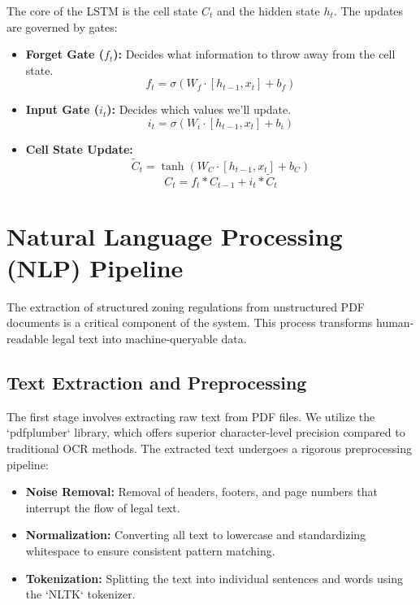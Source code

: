 \documentclass[12pt,a4paper]{report}
\begin{document}
The core of the LSTM is the cell state $C_t$ and the hidden state $h_t$. The updates are governed by gates:
\begin{itemize}
    \item \textbf{Forget Gate ($f_t$):} Decides what information to throw away from the cell state.
    \begin{equation}
    f_t = \sigma(W_f \cdot [h_{t-1}, x_t] + b_f)
    \end{equation}
    \item \textbf{Input Gate ($i_t$):} Decides which values we'll update.
    \begin{equation}
    i_t = \sigma(W_i \cdot [h_{t-1}, x_t] + b_i)
    \end{equation}
    \item \textbf{Cell State Update:}
    \begin{equation}
    \tilde{C}_t = \tanh(W_C \cdot [h_{t-1}, x_t] + b_C)
    \end{equation}
    \begin{equation}
    C_t = f_t * C_{t-1} + i_t * \tilde{C}_t
    \end{equation}
\end{itemize}

\section{Natural Language Processing (NLP) Pipeline}
The extraction of structured zoning regulations from unstructured PDF documents is a critical component of the system. This process transforms human-readable legal text into machine-queryable data.

\subsection{Text Extraction and Preprocessing}
The first stage involves extracting raw text from PDF files. We utilize the `pdfplumber` library, which offers superior character-level precision compared to traditional OCR methods. The extracted text undergoes a rigorous preprocessing pipeline:
\begin{itemize}
    \item \textbf{Noise Removal:} Removal of headers, footers, and page numbers that interrupt the flow of legal text.
    \item \textbf{Normalization:} Converting all text to lowercase and standardizing whitespace to ensure consistent pattern matching.
    \item \textbf{Tokenization:} Splitting the text into individual sentences and words using the `NLTK` tokenizer.
\end{itemize}
\end{document}
